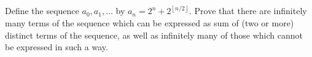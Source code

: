 Define the sequence $a_0, a_1, \dots$ by $a_n = 2^n + 2^{\left \lfloor{n/2}\right \rfloor }$. Prove that there are infinitely many terms of the sequence which can be expressed as sum of (two or more) distinct terms of the sequence, as well as infinitely many of those which cannot be expressed in such a way.